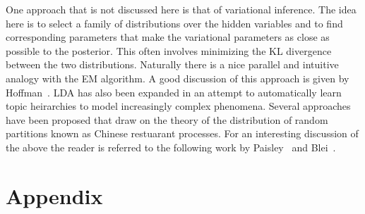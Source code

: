\documentclass{article}%
\theoremstyle{definition}
\begin{document}
One approach that is not discussed here is that of variational inference. The idea here is to select a family of distributions over the hidden variables and to find corresponding parameters that make the variational parameters as close as possible to the posterior. This often involves minimizing the KL divergence between the two distributions. Naturally there is a nice parallel and intuitive analogy with the EM algorithm. A good discussion of this approach is given by Hoffman~\cite{Hoffman:2013:SVI:2502581.2502622}. LDA has also been expanded in an attempt to automatically learn topic heirarchies to model increasingly complex phenomena. Several approaches have been proposed that draw on the theory of the distribution of random partitions known as Chinese restuarant processes. For an interesting discussion of the above the reader is referred to the following work by Paisley~\cite{DBLP:journals/pami/PaisleyWBJ15} and Blei~\cite{Blei04hierarchicaltopic}.

{}

\clearpage
\section{Appendix}
\label{sec:appx}
\end{document}

